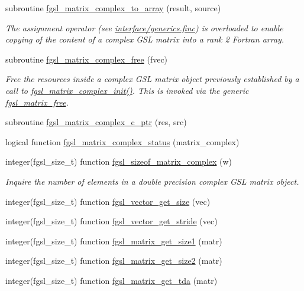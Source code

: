 \begin{DoxyCompactItemize}
subroutine \hyperlink{array_8finc_a4b17724c0c305144fdec66507f8638f7}{fgsl\+\_\+matrix\+\_\+complex\+\_\+to\+\_\+array} (result, source)
\begin{DoxyCompactList}\small\item\em The assignment operator (see \hyperlink{generics_8finc}{interface/generics.\+finc}) is overloaded to enable copying of the content of a complex G\+S\+L matrix into a rank 2 Fortran array. \end{DoxyCompactList}\item 
subroutine \hyperlink{array_8finc_aa26219798c626c7bf6a0a85403f3dbcf}{fgsl\+\_\+matrix\+\_\+complex\+\_\+free} (fvec)
\begin{DoxyCompactList}\small\item\em Free the resources inside a complex G\+S\+L matrix object previously established by a call to \hyperlink{array_8finc_af7461bad6c35fe6dde17e9c06bbc5cd0}{fgsl\+\_\+matrix\+\_\+complex\+\_\+init()}. This is invoked via the generic \hyperlink{interfacefgsl__matrix__free}{fgsl\+\_\+matrix\+\_\+free}. \end{DoxyCompactList}\item 
subroutine \hyperlink{array_8finc_a9f0f952485ef9707174a52c5af21a9a2}{fgsl\+\_\+matrix\+\_\+complex\+\_\+c\+\_\+ptr} (res, src)
\item 
logical function \hyperlink{array_8finc_a3fa8db2b747286e805d60065f6d16640}{fgsl\+\_\+matrix\+\_\+complex\+\_\+status} (matrix\+\_\+complex)
\item 
integer(fgsl\+\_\+size\+\_\+t) function \hyperlink{array_8finc_a14d82675b93fa2b453caf33df1e567a1}{fgsl\+\_\+sizeof\+\_\+matrix\+\_\+complex} (w)
\begin{DoxyCompactList}\small\item\em Inquire the number of elements in a double precision complex G\+S\+L matrix object. \end{DoxyCompactList}\item 
integer(fgsl\+\_\+size\+\_\+t) function \hyperlink{array_8finc_a77255b64802ca66a1ada52fd0a9ceaf6}{fgsl\+\_\+vector\+\_\+get\+\_\+size} (vec)
\item 
integer(fgsl\+\_\+size\+\_\+t) function \hyperlink{array_8finc_adb3b5d4e8f719f06d11479ee5c7ad380}{fgsl\+\_\+vector\+\_\+get\+\_\+stride} (vec)
\item 
integer(fgsl\+\_\+size\+\_\+t) function \hyperlink{array_8finc_a17354bcc1b817f078799391343eee7e4}{fgsl\+\_\+matrix\+\_\+get\+\_\+size1} (matr)
\item 
integer(fgsl\+\_\+size\+\_\+t) function \hyperlink{array_8finc_a14ea1256acfbe059e0ea8e631a470f64}{fgsl\+\_\+matrix\+\_\+get\+\_\+size2} (matr)
\item 
integer(fgsl\+\_\+size\+\_\+t) function \hyperlink{array_8finc_ae49791bd4fbcbd27b90f1cf665fcb008}{fgsl\+\_\+matrix\+\_\+get\+\_\+tda} (matr)
\end{DoxyCompactItemize}


